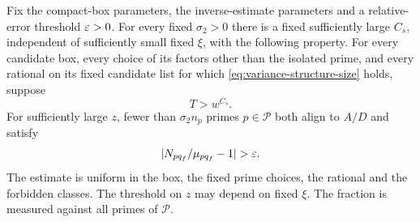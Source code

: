 \begin{proposition}\label{prop:structured-variance}
Fix the compact-box parameters, the inverse-estimate parameters and a
relative-error threshold \(\varepsilon>0\). For every fixed \(\sigma_2>0\) there
is a fixed sufficiently large \(C_s\), independent of sufficiently small
fixed \(\xi\), with the following property.
For every candidate box, every choice of its factors other than the
isolated prime, and every rational on its fixed candidate list for which
\eqref{eq:variance-structure-size} holds, suppose
\[
 T>w^{C_s}.
\]
For sufficiently large \(z\), fewer than \(\sigma_2 n_p\) primes
\(p\in\mathcal P\) both align to \(A/D\) and satisfy
\[
 |N_{pq_f}/\mu_{pq_f}-1|>\eps.
\]
The estimate is uniform in the box, the fixed prime choices, the rational
and the forbidden classes. The threshold on \(z\) may depend on fixed
\(\xi\). The fraction is measured against all primes of \(\mathcal P\).
\end{proposition}


